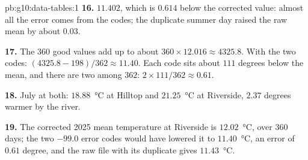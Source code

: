 \begin{solution}{pb:g10:data-tables:1}
\textbf{16.} $11.402$, which is $0.614$ below the corrected value: almost all the error comes from the codes; the
duplicate summer day raised the raw mean by about $0.03$.

\textbf{17.} The $360$ good values add up to about $360 \times 12.016 \approx 4325.8$. With the two codes:
$(4325.8 - 198) / 362 \approx 11.40$. Each code sits about $111$ degrees below the mean, and there are two among
$362$: $2 \times 111 / 362 \approx 0.61$.

\textbf{18.} July at both: $18.88$~°C at Hilltop and $21.25$~°C at Riverside, $2.37$ degrees warmer by the river.

\textbf{19.} The corrected 2025 mean temperature at Riverside is $12.02$~°C, over $360$ days; the two $-99.0$ error
codes would have lowered it to $11.40$~°C, an error of $0.61$ degree, and the raw file with its duplicate gives
$11.43$~°C.
\end{solution}
